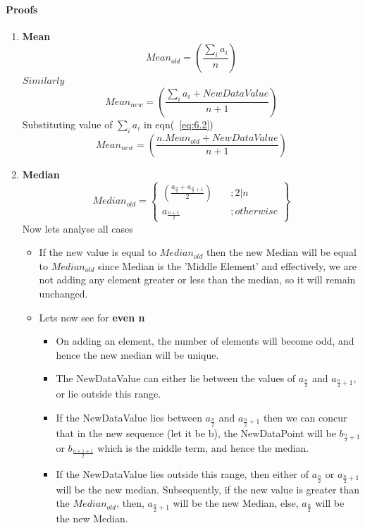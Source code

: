 \documentclass[12pt]{article}
\begin{document}
\paragraph{Proofs}
\begin{enumerate}
\item {\Large\textbf {Mean}} \newline
\begin{equation} \label{eq:6.1}
Mean_{old} = \left(\frac{\sum_{i}a_i}{n}\right)
\end{equation}
$Similarly$
\begin{equation} \label{eq:6.2}
Mean_{new} = \left(\frac{\sum_{i}a_i + NewDataValue}{n+1}\right)
\end{equation}
Substituting value of $\sum_ia_i$ in eqn(~\ref{eq:6.2})
\begin{equation} \label{eq:6.3}
Mean_{new} = \left(\frac{n.Mean_{old} + NewDataValue}{n+1}\right)
\end{equation}

\item {\Large\textbf {Median}} \newline
\begin{equation*}
Median_{old} = \left\{
        \begin{array}{ll}
            \left(\frac{a_\frac{n}{2} + a_{\frac{n}{2}+1}}{2}\right) & \quad ; 2 | n \\
            a_\frac{n+1}{2} & \quad ;otherwise
        \end{array}
    \right\}
\end{equation*}
Now lets analyse all cases
\begin{itemize}
\item If the new value is equal to $Median_{old}$ then the new Median will be equal to $Median_{old}$ since Median is the 'Middle Element' and effectively, we are not adding any element greater or less than the median, so it will remain unchanged.
\item Lets now see for \textbf{even n}
	\begin{itemize}
	\item On adding an element, the number of elements will become odd, and hence the new median will be unique.
	\item The NewDataValue can either lie between the values of $a_\frac{n}{2}$ and $a_{\frac{n}{2}+1}$, or lie outside this range.
	\item If the NewDataValue lies between $a_\frac{n}{2}$ and $a_{\frac{n}{2}+1}$ then we can concur that in the new sequence (let it be b), the NewDataPoint will be $b_{\frac{n}{2} + 1}$ or $b_{\frac{n+1+1}{2}}$ which is the middle term, and hence the median.
	\item If the NewDataValue lies outside this range, then either of $a_\frac{n}{2}$ or $a_{\frac{n}{2}+1}$ will be the new median. Subsequently, if the new value is greater than the $Median_{old}$, then, $a_{\frac{n}{2}+1}$ will be the new Median, else, $a_{\frac{n}{2}}$ will be the new Median.
	\end{itemize}
	

\end{itemize}
\end{enumerate}
\end{document}
